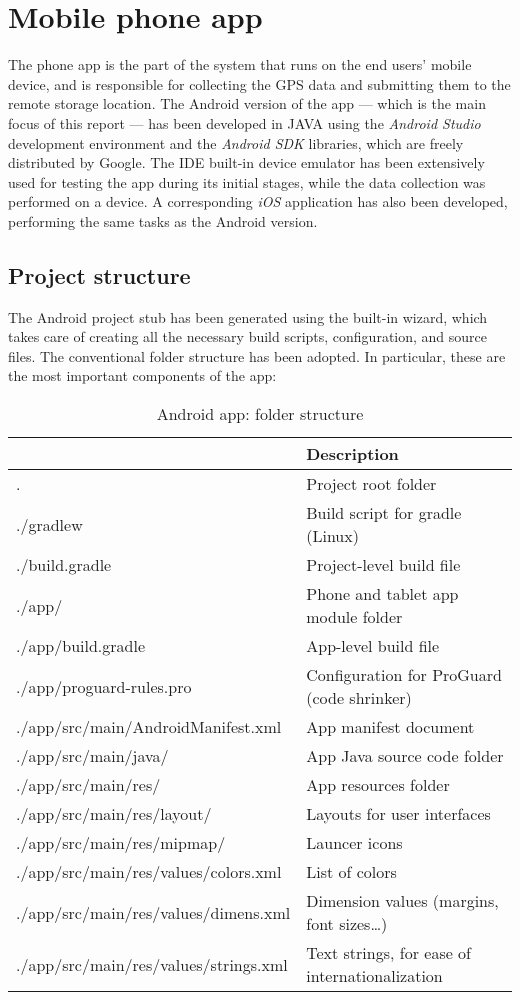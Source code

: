 \section{Mobile phone app}
The phone app is the part of the system that runs on the end users' mobile device, and is responsible for collecting the GPS data and submitting them to the remote storage location.
The Android version of the app --- which is the main focus of this report --- has been developed in JAVA using the \emph{Android Studio}  development environment and the \emph{Android SDK} libraries, which are freely distributed by Google.
The IDE built-in device emulator has been extensively used for testing the app during its initial stages, while the data collection was performed on a device.
A corresponding \emph{iOS} application has also been developed, performing the same tasks as the Android version.


\subsection{Project structure}
The Android project stub has been generated using the built-in wizard, which takes care of creating all the necessary build scripts, configuration, and source files.
The conventional folder structure has been adopted.
In particular, these are the most important components of the app:

\begin{table}[H]
\centerfloat
\begin{tabular}{@{} >{\ttfamily\footnotesize}l >{\footnotesize}l @{}}
	\toprule
	\normalfont{Directory or file}	& Description \\
	\midrule
	.							& Project root folder \\
	./gradlew					& Build script for gradle (Linux) \\
	./build.gradle				& Project-level build file \\
	./app/						& Phone and tablet app module folder \\
	./app/build.gradle			& App-level build file \\
	./app/proguard-rules.pro	& Configuration for ProGuard (code shrinker) \\
	./app/src/main/AndroidManifest.xml		& App manifest document \\
	./app/src/main/java/					& App Java source code folder \\
	./app/src/main/res/						& App resources folder \\
	./app/src/main/res/layout/				& Layouts for user interfaces \\
	./app/src/main/res/mipmap/				& Launcer icons \\
	./app/src/main/res/values/colors.xml	& List of colors \\
	./app/src/main/res/values/dimens.xml	& Dimension values (margins, font sizes\dots) \\
	./app/src/main/res/values/strings.xml	& Text strings, for ease of internationalization \\
	\bottomrule
\end{tabular}
\caption{{\footnotesize Android app: folder structure}}
\end{table}

